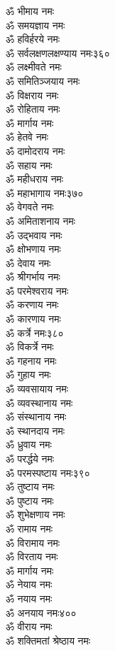\begin{multicols}{2}
\begin{flushleft}
ॐ भीमाय नमः\\
ॐ समयज्ञाय नमः\\
ॐ हविर्हरये नमः\\
ॐ सर्वलक्षणलक्षण्याय नमः\hfill ३६०\\
ॐ लक्ष्मीवते नमः\\
ॐ समितिञ्जयाय नमः\\
ॐ विक्षराय नमः\\
ॐ रोहिताय नमः\\
ॐ मार्गाय नमः\\
ॐ हेतवे नमः\\
ॐ दामोदराय नमः\\
ॐ सहाय नमः\\
ॐ महीधराय नमः\\
ॐ महाभागाय नमः\hfill ३७०\\
ॐ वेगवते नमः\\
ॐ अमिताशनाय नमः\\
ॐ उद्भवाय नमः\\
ॐ क्षोभणाय नमः\\
ॐ देवाय नमः\\
ॐ श्रीगर्भाय नमः\\
ॐ परमेश्वराय नमः\\
ॐ करणाय नमः\\
ॐ कारणाय नमः\\
ॐ कर्त्रे नमः\hfill ३८०\\
ॐ विकर्त्रे नमः\\
ॐ गहनाय नमः\\
ॐ गुहाय नमः\\
ॐ व्यवसायाय नमः\\
ॐ व्यवस्थानाय नमः\\
ॐ संस्थानाय नमः\\
ॐ स्थानदाय नमः\\
ॐ ध्रुवाय नमः\\
ॐ परर्द्धये नमः\\
ॐ परमस्पष्टाय नमः\hfill ३९०\\
ॐ तुष्टाय नमः\\
ॐ पुष्टाय नमः\\
ॐ शुभेक्षणाय नमः\\
ॐ रामाय नमः\\
ॐ विरामाय नमः\\
ॐ विरताय नमः\\
ॐ मार्गाय नमः\\
ॐ नेयाय नमः\\
ॐ नयाय नमः\\
ॐ अनयाय नमः\hfill ४००\\
ॐ वीराय नमः\\
ॐ शक्तिमतां श्रेष्ठाय नमः\\

\end{flushleft}
\end{multicols}

